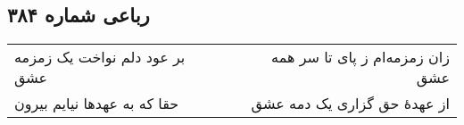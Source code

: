 \begin{center}
\section*{رباعی شماره ۳۸۴}
\label{sec:sh384}
\begin{longtable}{l p{0.5cm} r}
بر عود دلم نواخت یک زمزمه عشق
&&
زان زمزمه‌ام ز پای تا سر همه عشق
\\
حقا که به عهدها نیایم بیرون
&&
از عهدهٔ حق گزاری یک دمه عشق
\\
\end{longtable}
\end{center}
